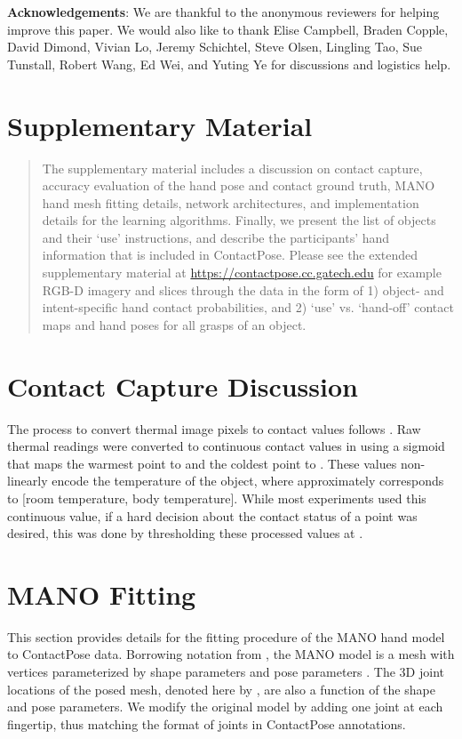 \documentclass[runningheads]{llncs}
\begin{document}
\FloatBarrier
\noindent\textbf{Acknowledgements}: We are thankful to the anonymous reviewers for helping improve this paper. We would also like to thank Elise Campbell, Braden Copple, David Dimond, Vivian Lo, Jeremy Schichtel, Steve Olsen, Lingling Tao, Sue Tunstall, Robert Wang, Ed Wei, and Yuting Ye for discussions and logistics help. \appendix
\section*{Supplementary Material}

\begin{abstract}
The supplementary material includes a discussion on contact capture, accuracy evaluation of the hand pose and contact ground truth, MANO hand mesh \cite{romero2017embodied} fitting details, network architectures, and implementation details for the learning algorithms. Finally, we present the list of objects and their `use' instructions, and describe the participants' hand information that is included in ContactPose. Please see the extended supplementary material at \url{https://contactpose.cc.gatech.edu} for example RGB-D imagery and slices through the data in the form of 1) object- and intent-specific hand contact probabilities, and 2) `use' vs. `hand-off' contact maps and hand poses for all grasps of an object.
\end{abstract}

\section{Contact Capture Discussion}
The process to convert thermal image pixels to contact values follows \cite{contactdbv1}. Raw thermal readings were converted to continuous contact values in  using a sigmoid that maps the warmest point to  and the coldest point to . These values non-linearly encode the temperature of the object, where  approximately corresponds to [room temperature, body temperature]. While most experiments used this continuous value, if a hard decision about the contact status of a point was desired, this was done by thresholding these processed values at . \section{MANO Fitting}
This section provides details for the fitting procedure of the MANO \cite{romero2017embodied} hand model to ContactPose data. Borrowing notation from \cite{romero2017embodied}, the MANO model is a mesh with vertices  parameterized by shape parameters  and pose parameters . The 3D joint locations of the posed mesh, denoted here by , are also a function of the shape and pose parameters. We modify the original model by adding one joint at each fingertip, thus matching the format of joints  in ContactPose annotations.
\end{document}

